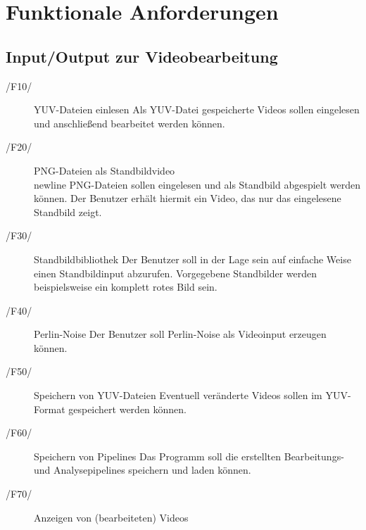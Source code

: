 \section{Funktionale Anforderungen}

\subsection{Input/Output zur Videobearbeitung}
 
\begin{description}
        \item[/F10/]YUV-Dateien einlesen \label{F10}\newline
                Als YUV-Datei gespeicherte Videos sollen eingelesen und anschließend bearbeitet werden können.
        \item[/F20/]PNG-Dateien als Standbildvideo \label{F20}\\newline
                PNG-Dateien sollen eingelesen und als Standbild abgespielt werden können. Der Benutzer erhält hiermit ein Video, das nur das eingelesene Standbild zeigt.
        \item[/F30/]Standbildbibliothek \newline
                Der Benutzer soll in der Lage sein auf einfache Weise einen Standbildinput abzurufen. Vorgegebene Standbilder werden beispielsweise ein komplett rotes Bild sein.
        \item[/F40/]Perlin-Noise \newline
                Der Benutzer soll Perlin-Noise als Videoinput erzeugen können.
        \item[/F50/]Speichern von YUV-Dateien \newline
                Eventuell veränderte Videos sollen im YUV-Format gespeichert werden können.
        \item[/F60/]Speichern von Pipelines \label{F60}\newline
                Das Programm soll die erstellten Bearbeitungs- und Analysepipelines speichern und laden können.
        \item[/F70/]Anzeigen von (bearbeiteten) Videos
\end{description}
 
